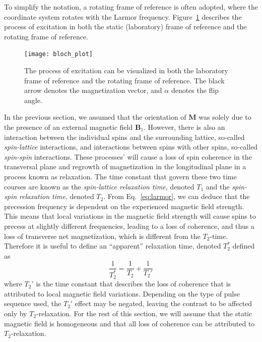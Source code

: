 To simplify the notation, a rotating frame of reference is often adopted, where the coordinate system rotates with the Larmor frequency. Figure~\ref{fig:blochplots_1} describes the process of excitation in both the static (laboratory) frame of reference and the rotating frame of reference.
\begin{figure}[htbp]
    \centering
    \texttt{[image: bloch\_plot]}
    \caption{The process of excitation can be visualized in both the laboratory frame of reference and the rotating frame of reference. The black arrow denotes the magnetization vector, and $\alpha$ denotes the flip angle.}
    \label{fig:blochplots_1}
\end{figure}
In the previous section, we assumed that the orientation of $\textbf{M}$ was solely due to the presence of an external magnetic field $\textbf{B}_1$. However, there is also an interaction between the individual spins and the surrounding lattice, so-called \emph{spin-lattice} interactions, and interactions between spins with other spins, so-called \emph{spin-spin} interactions. These processes' will cause a loss of spin coherence in the transversal plane and regrowth of magnetization in the longitudinal plane in a process known as relaxation. The time constant that govern these two time courses are known as the \emph{spin-lattice relaxation time}, denoted $T_1$ and the \emph{spin-spin relaxation time}, denoted $T_2$. From Eq.~\ref{eq:larmor}, we can deduce that the precession frequency is dependent on the experienced magnetic field strength. This means that local variations in the magnetic field strength will cause spins to precess at slightly different frequencies, leading to a loss of coherence, and thus a loss of transverse net magnetization, which is different from the $T_2$-time. Therefore it is useful to define an ``apparent'' relaxation time, denoted $T_2^*$ defined as
\begin{equation}
    \label{eq:t2star}
    \frac{1}{T_2^*} = \frac{1}{T_2} + \frac{1}{T_2'}
\end{equation}
where $T_2'$ is the time constant that describes the loss of coherence that is attributed to local magnetic field variations. Depending on the type of pulse sequence used, the $T_2'$ effect may be negated, leaving the contrast to be affected only by $T_2$-relaxation. For the rest of this section, we will assume that the static magnetic field is homogeneous and that all loss of coherence can be attributed to $T_2$-relaxation.

